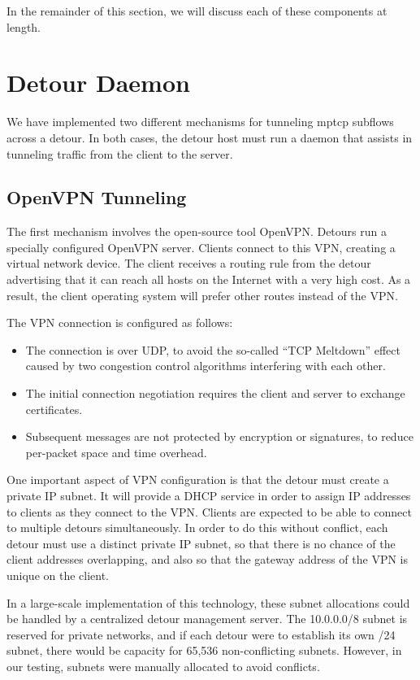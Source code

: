 \documentclass{cwru}
\begin{document}
In the remainder of this section, we will discuss each of these components at
length.

\section{Detour Daemon}

We have implemented two different mechanisms for tunneling \ac{mptcp} subflows across
a detour. In both cases, the detour host must run a daemon that assists in
tunneling traffic from the client to the server.

\subsection{OpenVPN Tunneling}

The first mechanism involves the open-source tool OpenVPN. Detours run a
specially configured OpenVPN server. Clients connect to this VPN, creating a
virtual network device. The client receives a routing rule from the detour
advertising that it can reach all hosts on the Internet with a very high cost.
As a result, the client operating system will prefer other routes instead of the
VPN.

The VPN connection is configured as follows:

\begin{itemize}
\item The connection is over UDP, to avoid the so-called ``TCP Meltdown'' effect
  caused by two congestion control algorithms interfering with each other.
\item The initial connection negotiation requires the client and server to
  exchange certificates.
\item Subsequent messages are not protected by encryption or signatures, to
  reduce per-packet space and time overhead.
\end{itemize}

One important aspect of VPN configuration is that the detour must create a
private IP subnet. It will provide a DHCP service in order to assign IP
addresses to clients as they connect to the VPN. Clients are expected to be able
to connect to multiple detours simultaneously. In order to do this without
conflict, each detour must use a distinct private IP subnet, so that there is no
chance of the client addresses overlapping, and also so that the gateway address
of the VPN is unique on the client.

In a large-scale implementation of this technology, these subnet allocations
could be handled by a centralized detour management server. The 10.0.0.0/8
subnet is reserved for private networks, and if each detour were to establish
its own /24 subnet, there would be capacity for 65,536 non-conflicting subnets.
However, in our testing, subnets were manually allocated to avoid conflicts.
\end{document}

